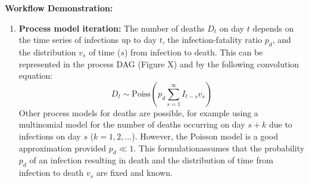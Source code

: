 \documentclass{article}
\begin{document}
\textbf{Workflow Demonstration:}
\begin{enumerate}
    \item \textbf{Process model iteration:} The number of deaths $D_t$ on day $t$ depends on the time series of infections up to day $t$, the infection-fatality ratio $p_d$, and the distribution $v_s$ of time ($s$) from infection to death. This can be represented in the process DAG (Figure X) and by the following convolution equation:
    \begin{equation} \label{eq:deaths}
        D_t \sim \mathrm{Poiss}\left(p_d \sum_{s=1}^\infty I_{t-s}v_s \right)
    \end{equation}
    Other process models for deaths are possible, for example using a multinomial model for the number of deaths occurring on day $s+k$ due to infections on day $s$ ($k=1,2,\ldots$). However, the Poisson model is a good approximation provided $p_d\ll 1$. This formulationassumes that the probability $p_d$ of an infection resulting in death and the distribution of time from infection to death $v_s$ are fixed and known.
    

\end{enumerate}
\end{document}
